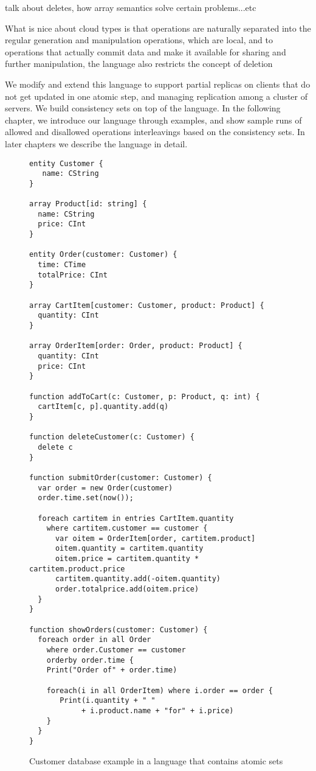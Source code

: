 talk about deletes, how array semantics solve certain problems...etc

What is nice about cloud types is that operations are naturally separated into
the regular generation and manipulation operations, which are local, and to
operations that actually commit data and make it available for sharing and
further manipulation, the language also restricts the concept of deletion

We modify and extend this language to support partial replicas on clients that
do not get updated in one atomic step, and managing replication among a cluster 
of servers. We build consistency sets on
top of the language. In the following chapter, we introduce our language through
examples, and show sample runs of allowed and disallowed operations
interleavings based on the consistency sets. In later chapters we describe the language in detail.

\begin{figure}[tp]
\begin{lstlisting}
entity Customer {
   name: CString
}

array Product[id: string] {
  name: CString
  price: CInt
}

entity Order(customer: Customer) {
  time: CTime
  totalPrice: CInt
}

array CartItem[customer: Customer, product: Product] {
  quantity: CInt
}

array OrderItem[order: Order, product: Product] {
  quantity: CInt
  price: CInt
}

function addToCart(c: Customer, p: Product, q: int) {
  cartItem[c, p].quantity.add(q)
}

function deleteCustomer(c: Customer) {
  delete c
}

function submitOrder(customer: Customer) {
  var order = new Order(customer)
  order.time.set(now());

  foreach cartitem in entries CartItem.quantity 
    where cartitem.customer == customer {
      var oitem = OrderItem[order, cartitem.product]
      oitem.quantity = cartitem.quantity
      oitem.price = cartitem.quantity * cartitem.product.price
      cartitem.quantity.add(-oitem.quantity)
      order.totalprice.add(oitem.price)
  }
}

function showOrders(customer: Customer) {
  foreach order in all Order
    where order.Customer == customer
    orderby order.time {    
    Print("Order of" + order.time)
    
    foreach(i in all OrderItem) where i.order == order {
       Print(i.quantity + " " 
            + i.product.name + "for" + i.price)
    }
  }
}
\end{lstlisting}
\caption{Customer database example in a language that contains atomic sets}
\label{lst:ctStore}
\end{figure}


